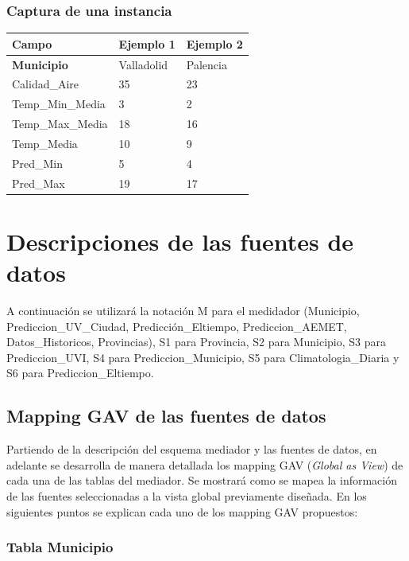 \documentclass[12pt, a4paper]{article}
\begin{document}
\subsubsection*{Captura de una instancia}
\begin{center}
\begin{tabular}{|p{}|p{}|p{}|}
\hline
\textbf{Campo} & \textbf{Ejemplo 1} & \textbf{Ejemplo 2} \\
\hline
\textbf{Municipio} & Valladolid & Palencia \\
Calidad\_Aire & 35 & 23 \\
Temp\_Min\_Media & 3 & 2 \\
Temp\_Max\_Media & 18 & 16 \\
Temp\_Media & 10 & 9 \\
Pred\_Min & 5 & 4 \\
Pred\_Max & 19 & 17 \\
\hline
\end{tabular}
\end{center}

\section{Descripciones de las fuentes de datos}

A continuación se utilizará la notación M para el medidador (Municipio, Prediccion\_UV\_Ciudad, Predicción\_Eltiempo, Prediccion\_AEMET, Datos\_Historicos, Provincias), S1 para Provincia, S2 para Municipio, S3 para Prediccion\_UVI, S4 para Prediccion\_Municipio, S5 para Climatologia\_Diaria y S6 para Prediccion\_Eltiempo.

\subsection{Mapping GAV de las fuentes de datos}

Partiendo de la descripción del esquema mediador y las fuentes de datos, en adelante 
se desarrolla de manera detallada los mapping GAV (\textit{Global as View}) de cada 
una de las tablas del mediador. Se mostrará como se mapea la información de las fuentes 
seleccionadas a la vista global previamente diseñada.
En los siguientes puntos se explican cada uno de los mapping GAV propuestos:

\subsubsection{Tabla Municipio}
\end{document}
